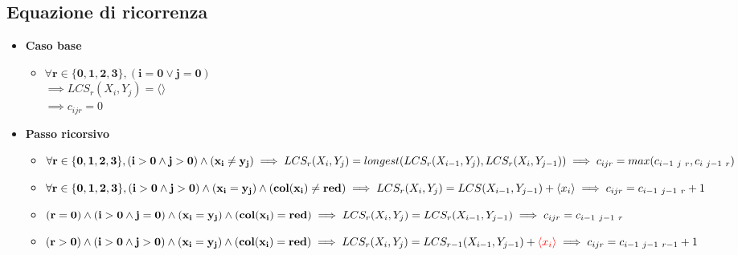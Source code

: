 \subsection{Equazione di ricorrenza}
\begin{itemize}
    \item \textbf{Caso base}
    \begin{itemize}
        \item { \large
                $\mathbf{\forall r \in \{0,1,2,3\},(i = 0 \lor j=0)}$ \\ $\implies LCS_r(X_i,Y_j) = \langle \rangle$ \\
                $\implies c_{ijr} = 0$
            }
    \end{itemize}
    \item \textbf{Passo ricorsivo}
    \begin{itemize}
        \item 
        {
            \large
            $
            \mathbf
            {
                \forall r \in \{0,1,2,3\}, (i>0 \land j>0) \land (x_i \not = y_j) 
            } \\
            \implies LCS_r(X_i,Y_j) = longest(LCS_r(X_{i-1},Y_j),LCS_r(X_i,Y_{j-1})) \\
            \implies c_{ijr} = max(c_{i-1\ j\ r}, c_{i\ j-1\ r})
            $
        }
        \item 
        {
            \large
            $
                \mathbf
                {
                    \forall r \in \{0,1,2,3\}, (i>0 \land j>0) \land (x_i = y_j) \land (col(x_i) \not = red)
                } \\
                \implies LCS_r(X_i,Y_j) = LCS(X_{i-1},Y_{j-1}) + {\langle x_i \rangle} \\
                \implies c_{ijr} = c_{i-1\ j-1\ r} + 1
            $
        }
        \item
        {
            \large
            $
                \mathbf
                {
                    (r=0) \land (i>0 \land j=0) \land (x_i = y_j) \land (col(x_i) = red)
                } \\
                \implies LCS_r(X_i,Y_j) = LCS_r(X_{i-1},Y_{j-1}) \\
                \implies c_{ijr} = c_{i-1\ j-1\ r}
            $
        }
        \item
        {
            \large
            $
                \mathbf
                {
                    (r>0) \land (i > 0 \land j > 0) \land (x_i = y_j) \land (col(x_i) = red)
                } \\
                \implies LCS_r(X_i,Y_j) = LCS_{r-1}(X_{i-1},Y_{j-1}) + {\color{red} \langle x_i \rangle} \\
                \implies c_{ijr} = c_{i-1 \ j-1\ r-1} + 1
            $
        }
    \end{itemize}
\end{itemize}

